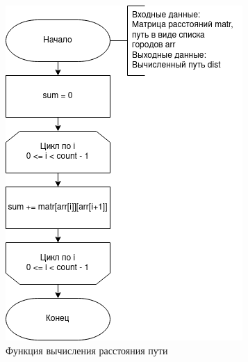 \begin{figure}[H]
	\begin{center}
		\includegraphics[scale=0.6]{assets/calc_dist.png}
	\end{center}
	\caption{Функция вычисления расстояния пути}
\end{figure}


